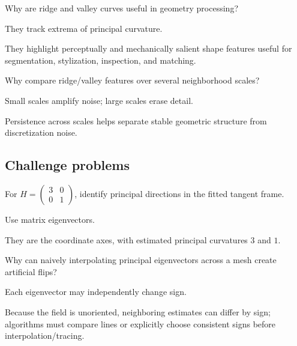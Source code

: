 \begin{exercise}\label{exr:vii42-ped-13}
Why are ridge and valley curves useful in geometry processing?
\end{exercise}

\begin{hint}
They track extrema of principal curvature.
\end{hint}

\begin{solution}
They highlight perceptually and mechanically salient shape features useful for segmentation, stylization, inspection, and matching.
\end{solution}

\begin{exercise}\label{exr:vii42-ped-14}
Why compare ridge/valley features over several neighborhood scales?
\end{exercise}

\begin{hint}
Small scales amplify noise; large scales erase detail.
\end{hint}

\begin{solution}
Persistence across scales helps separate stable geometric structure from discretization noise.
\end{solution}

\subsection*{Challenge problems}

\begin{exercise}\label{exr:vii42-ped-15}
For \(H=\begin{pmatrix}3&0\\0&1\end{pmatrix}\), identify principal directions in the fitted tangent frame.
\end{exercise}

\begin{hint}
Use matrix eigenvectors.
\end{hint}

\begin{solution}
They are the coordinate axes, with estimated principal curvatures \(3\) and \(1\).
\end{solution}

\begin{exercise}\label{exr:vii42-ped-16}
Why can naively interpolating principal eigenvectors across a mesh create artificial flips?
\end{exercise}

\begin{hint}
Each eigenvector may independently change sign.
\end{hint}

\begin{solution}
Because the field is unoriented, neighboring estimates can differ by sign; algorithms must compare lines or explicitly choose consistent signs before interpolation/tracing.
\end{solution}

